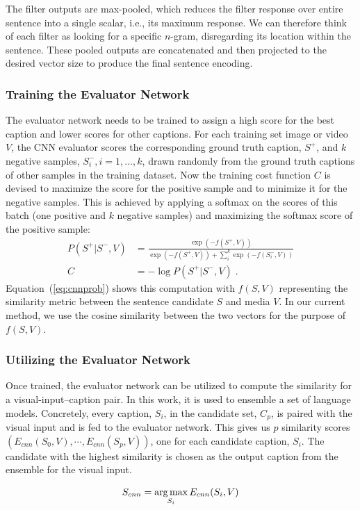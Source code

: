 The filter outputs are max-pooled, which reduces the filter response over entire
sentence into a single scalar, i.e., its maximum response. 
We can therefore think of each filter as looking for a specific $n$-gram,
disregarding its location within the sentence.
These pooled outputs are concatenated and then projected to the desired vector
size to produce the final sentence encoding.


\subsubsection{Training the Evaluator Network}

The evaluator network needs to be trained to assign a high score for the best
caption and lower scores for other captions.
For each training set image or video $V$, the CNN evaluator scores the
corresponding ground truth caption, $S^+$, and $k$ negative samples, $S_i^-,
i=1,\ldots,k$, drawn randomly from the ground truth captions of other samples in
the training dataset.
Now the training cost function $C$ is devised to maximize the score for the
positive sample and to minimize it for the negative samples. 
This is achieved by applying a softmax on the scores of this batch (one positive
and $k$ negative samples) and maximizing the softmax score of the positive sample:
\begin{align}
  \label{eq:cnnprob} 
  P(S^+|S^-,V) &= \frac{\exp(-f(S^+,V))}{\exp(-f(S^+,V)) +
           \sum\limits_i^k{\exp(-f(S_i^- ,V))}} \\
  C &= -\log P(S^+|S^-,V) \;.
\end{align}
Equation~(\ref{eq:cnnprob}) shows this computation with $f(S,V)$ representing
the similarity metric between the sentence candidate $S$ and media $V$.
In our current method, we use the cosine similarity between the two vectors for
the purpose of $f(S,V)$.


\subsubsection{Utilizing the Evaluator Network}

Once trained, the evaluator network can be utilized to compute the similarity
for a visual-input--caption pair.
In this work, it is used to ensemble a set of language models.
Concretely, every caption, $S_i$, in the candidate set, $C_p$, is paired with
the visual input and is fed to the evaluator network. 
This gives us $p$ similarity scores $(E_{cnn}(S_0,V),\cdots,E_{cnn}(S_p,V))$,
one for each candidate caption, $S_i$.
The candidate with the highest similarity is chosen as the output caption from
the ensemble for the visual input.

\begin{equation}
        S_{cnn} = \operatorname*{arg\,max}_{S_i} E_{cnn}(S_i,V)\\
\end{equation}
